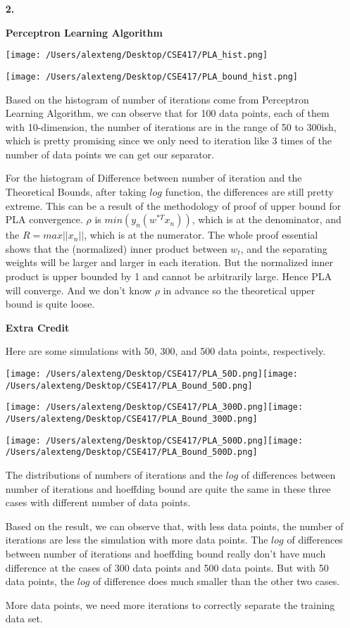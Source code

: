 \documentclass[11pt]{article}
\begin{document}
\begin{enumerate}

\item[\textbf{2.}]

\textbf{Perceptron Learning Algorithm}

\texttt{[image: /Users/alexteng/Desktop/CSE417/PLA\_hist.png]}


\texttt{[image: /Users/alexteng/Desktop/CSE417/PLA\_bound\_hist.png]}

Based on the histogram of number of iterations come from Perceptron Learning Algorithm, we can observe that for 100 data points, each of them with 10-dimension, the number of iterations are in the range of 50 to 300ish, which is pretty promising since we only need to iteration like 3 times of the number of data points we can get our separator. 

For the histogram of Difference between number of iteration and the Theoretical Bounds, after taking $log$ function, the differences are still pretty extreme. This can be a result of the methodology of proof of upper bound for PLA convergence. $\rho$ is $min(y_n(w^{*T}x_n))$, which is at the denominator, and the $R = max||x_n||$, which is at the numerator. The whole proof essential shows that the (normalized) inner product between $w_t$, and the separating weights will be larger and larger in each iteration. But the normalized inner product is upper bounded by 1 and cannot be arbitrarily large. Hence PLA will converge. And we don't know $\rho$ in advance so the theoretical upper bound is quite loose.

\pagebreak

\textbf{Extra Credit}

Here are some simulations with 50, 300, and 500 data points, respectively.

\texttt{[image: /Users/alexteng/Desktop/CSE417/PLA\_50D.png]}\texttt{[image: /Users/alexteng/Desktop/CSE417/PLA\_Bound\_50D.png]}

\texttt{[image: /Users/alexteng/Desktop/CSE417/PLA\_300D.png]}\texttt{[image: /Users/alexteng/Desktop/CSE417/PLA\_Bound\_300D.png]}

\texttt{[image: /Users/alexteng/Desktop/CSE417/PLA\_500D.png]}\texttt{[image: /Users/alexteng/Desktop/CSE417/PLA\_Bound\_500D.png]}

The distributions of numbers of iterations and the $log$ of differences between number of iterations and hoeffding bound are quite the same in these three cases with different number of data points.

Based on the result, we can observe that, with less data points, the number of iterations are less the simulation with more data points. The $log$ of differences between number of iterations and hoeffding bound really don't have much difference at the cases of 300 data points and 500 data points. But with 50 data points, the $log$ of difference does much smaller than the other two cases.

More data points, we need more iterations to correctly separate the training data set.

 
\end{enumerate}
\end{document}
